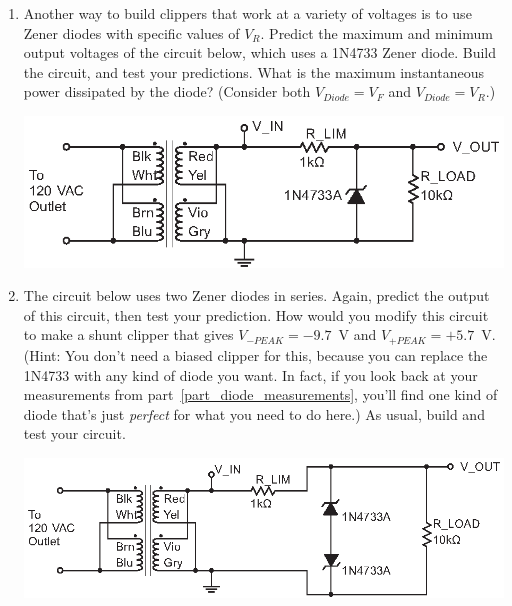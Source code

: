 \begin{enumerate}[wide]
\item Another way to build clippers that work at a variety of voltages is to use Zener diodes with specific values of $V_R$.  Predict the maximum and minimum output voltages of the circuit below, which uses a 1N4733 Zener diode.  Build the circuit, and test your predictions.  What is the maximum instantaneous power dissipated by the diode?  (Consider both $V_{Diode}=V_F$ and $V_{Diode}=V_R$.)  \label{part_zener_shunt_clipper}
\begin{center}
\includegraphics{diodes/zener_shunt_clipper.eps}
\end{center} 
 
\item The circuit below uses two Zener diodes in series.  Again, predict the output of this circuit, then test your prediction.  How would you modify this circuit to make a shunt clipper that gives $V_{-PEAK} = -9.7$~V and $V_{+PEAK} = +5.7$~V.   (Hint: You don't need a biased clipper for this, because you can replace the 1N4733 with any kind of diode you want.  In fact, if you look back at your measurements from part~\ref{part_diode_measurements}, you'll find one kind of diode that's just \textit{perfect} for what you need to do here.)  As usual, build and test your circuit. \label{part_double_zener_shunt_clipper}
\begin{center}
\includegraphics{diodes/double_zener_shunt_clipper.eps}
\end{center} 
 
\end{enumerate}



